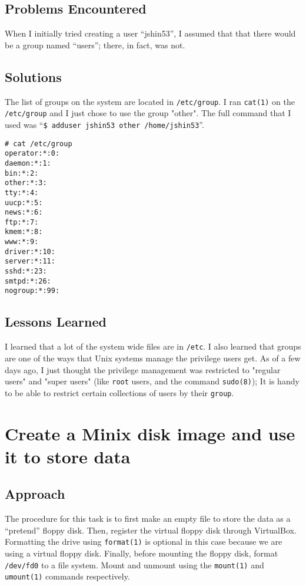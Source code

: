 \documentclass[11pt]{article}
\begin{document}
\subsection{Problems Encountered}
When I initially tried creating a user ``jshin53'', I assumed that that there would be a group named ``users''; there, in fact, was not.

\subsection{Solutions}
The list of groups on the system are located in {\tt /etc/group}. I ran {\tt cat(1)} on the {\tt /etc/group} and I just chose to use the group "other". The full command that I used was ``{\tt \$ adduser jshin53 other /home/jshin53}''.

\begin{verbatim}
# cat /etc/group
operator:*:0:
daemon:*:1:
bin:*:2:
other:*:3:
tty:*:4:
uucp:*:5:
news:*:6:
ftp:*:7:
kmem:*:8:
www:*:9:
driver:*:10:
server:*:11:
sshd:*:23:
smtpd:*:26:
nogroup:*:99:
\end{verbatim}

\subsection{Lessons Learned}
I learned that a lot of the system wide files are in {\tt /etc}. I also learned that groups are one of the ways that Unix systems manage the privilege users get. As of a few days ago, I just thought the privilege management was restricted to "regular users" and "super users" (like {\tt root} users, and the command {\tt sudo(8)}); It is handy to be able to restrict certain collections of users by their {\tt group}.

\section{Create a {\sc Minix} disk image and use it to store data}
\subsection{Approach}
The procedure for this task is to first make an empty file to store the data as a ``pretend'' floppy disk. Then, register the virtual floppy disk through {\sc VirtualBox}. Formatting the drive using {\tt format(1)} is optional in this case because we are using a virtual floppy disk. Finally, before mounting the floppy disk, format {\tt /dev/fd0} to a file system. Mount and unmount using the {\tt mount(1)} and {\tt umount(1)} commands respectively.
\end{document}
